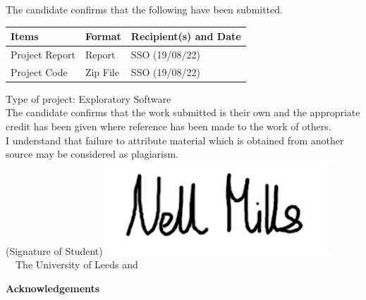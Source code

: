 \frontcover

\clearpage
\noindent The candidate confirms that the following have been submitted.\\
\begin{table}[ht!]
\begin{tabular}{|p{}|p{}|p{}|}
\hline 
Items & Format & Recipient(s) and Date \\ 
\hline 
Project Report & Report & SSO (19/08/22) \\ 
\hline 
Project Code & Zip File & SSO (19/08/22) \\ 
\hline
\end{tabular} 
\end{table}

\noindent Type of project: Exploratory Software
\vspace{\fill}\\
\noindent The candidate confirms that the work submitted is their own and the appropriate credit has been given where reference has been made to the work of others.
\vspace{\fill}\\
\noindent I understand that failure to attribute material which is obtained from another source may be considered as plagiarism.
\vspace{\fill}\\
\flushright(Signature of Student) \includegraphics{Images/Signature.png}
\flushleft
\vspace{\fill}
\textcopyright~\session~The University of Leeds and~\fullname

\begin{dissertationsummary}

\end{dissertationsummary}

\clearpage
\centering\textbf{Acknowledgements}
\flushleft


\tableofcontents


